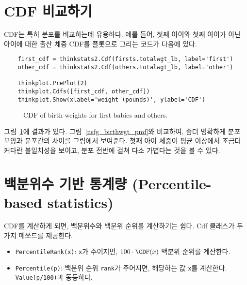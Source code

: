 \section{CDF 비교하기}
\label{birth_weights}

CDF는 특히 분포를 비교하는데 유용하다.
예를 들어, 첫째 아이와 첫째 아이가 아닌 아이에 대한 출산 체중 CDF를 플롯으로 그리는 코드가 다음에 있다.

\begin{verbatim}
    first_cdf = thinkstats2.Cdf(firsts.totalwgt_lb, label='first')
    other_cdf = thinkstats2.Cdf(others.totalwgt_lb, label='other')

    thinkplot.PrePlot(2)
    thinkplot.Cdfs([first_cdf, other_cdf])
    thinkplot.Show(xlabel='weight (pounds)', ylabel='CDF')
\end{verbatim}

\begin{figure}
\caption{CDF of birth weights for first babies and others.}
\label{cumulative_birthwgt_cdf}
\end{figure}

그림~\ref{cumulative_birthwgt_cdf}에 결과가 있다.
그림~\ref{nsfg_birthwgt_pmf}와 비교하여, 좀더 명확하게 분포 모양과 분포간의 차이를 그림에서 보여준다.
첫째 아이 체중이 평균 이상에서 조금더 커다란 불일치성을 보이고, 분포 전반에 걸쳐 다소 가볍다는 것을 볼 수 있다.


\section{백분위수 기반 통계량 (Percentile-based statistics)}

CDF를 계산하게 되면, 백분위수와 백분위 순위를 계산하기는 쉽다.
Cdf 클래스가 두가지 메쏘드를 제공한다.

\begin{itemize}

\item {\tt PercentileRank(x)}: {\tt x}가 주어지면, $100 \cdot \CDF(x)$ 백분위 순위를 계산한다.

\item {\tt Percentile(p)}: 백분위 순위 {\tt rank}가 주어지면,
해당하는 값 {\tt x}를 계산한다. {\tt Value(p/100)}과 동등하다.

\end{itemize}

